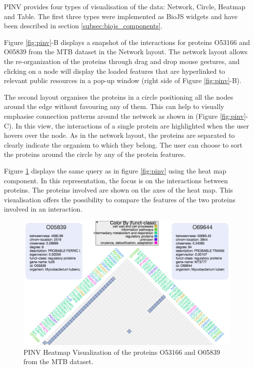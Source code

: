 PINV provides four types of visualisation of the data: Network, Circle, Heatmap and Table. The first three types were implemented as BioJS widgets and have been described in section \ref{subsec:biojs_components}. 

Figure \ref{fig:pinv}-B displays a snapshot of the interactions for proteins O53166 and O05839 from the MTB dataset in the Network layout. The network layout allows the re-organization of the proteins through drag and drop mouse gestures, and clicking on a node will display the loaded features that are hyperlinked to relevant public resources in a pop-up window (right side of Figure \ref{fig:pinv}-B).

The second layout organises the proteins in a circle positioning all the nodes around the edge without favouring any of them. This can help to visually emphasise connection patterns around the network as shown in (Figure \ref{fig:pinv}-C). In this view, the interactions of a single protein are highlighted when the user hovers over the node. As in the network layout, the proteins are separated to clearly indicate the organism to which they belong. The user can choose to sort the proteins around the circle by any of the protein features.

Figure \ref{fig:pinv_heatmap} displays the same query as in figure \ref{fig:pinv} using the heat map component. In this representation, the focus is on the interactions between proteins. The proteins involved are shown on the axes of the heat map. This visualisation offers the possibility to compare the features of the two proteins involved in an interaction.

\begin{figure}[ht]
\centering
\includegraphics[width=\textwidth]{figures/pinv_heatmap.png}
\caption[PINV Heatmap Visualization.]{PINV Heatmap Visualization of the proteins O53166 and O05839 from the MTB dataset.
\label{fig:pinv_heatmap}}
\end{figure}


